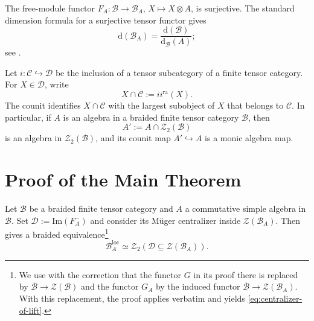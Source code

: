 \documentclass[10pt,a4paper]{amsart}
\numberwithin{equation}{section}
\newcommand{\B}{\mathcal{B}}
\newcommand{\C}{\mathcal{C}}
\newcommand{\D}{\mathcal{D}}
\newcommand{\Z}{\mathcal{Z}}
\newcommand{\loc}{\mathrm{loc}}
\newcommand{\ra}{\mathrm{ra}}
\newcommand{\im}{\mathrm{Im}}
\newcommand{\FP}{\mathrm{d}}
\begin{document}
The free-module functor $F_A:\B\to\B_A$, $X\mapsto X\otimes A$, is
surjective. The standard dimension formula for a surjective tensor functor
gives
\begin{equation}\label{eq:module-category-dimension}
  \FP(\B_A)=\frac{\FP(\B)}{\FP_{\B}(A)};
\end{equation}
see \cite[Lemma~6.2.4]{etingof2016tensor}.



Let $i:\C\hookrightarrow\D$ be the inclusion of a tensor subcategory of a
finite tensor category. For $X\in\D$, write
\[
  X\cap\C:=i i^{\ra}(X).
\]
The counit identifies $X\cap\C$ with the
largest subobject of $X$ that belongs to $\C$. In particular, if $A$ is an
algebra in a braided finite tensor category $\B$, then
\[
  A':=A\cap\Z_2(\B)
\]
is an algebra in $\Z_2(\B)$, and its counit map $A'\hookrightarrow A$ is a
monic algebra map.





\section{Proof of the Main Theorem}
\label{sec:main-theorem}

Let $\B$ be a braided finite tensor category and $A$ a commutative simple algebra in $\B$. 
Set $\D:=\im(F_A^-)$ and consider its M\"uger centralizer 
inside $\Z(\B_A)$. Then
\cite[Theorem~5.13]{shimizu2026commutative} gives a braided equivalence\footnote{We use \cite[Theorem~5.13]{shimizu2026commutative} with the correction that the functor $G$ in its proof there is replaced by $\overline{\mathcal B}\to\mathcal Z(\mathcal B)$ and the functor $G_A$ by the induced functor $\overline{\B}\to\Z(\B_A)$. With this replacement, the proof applies verbatim and yields \eqref{eq:centralizer-of-lift}.}
\begin{equation}\label{eq:centralizer-of-lift}
  \B_A^{\loc}
  \simeq
  \Z_2(\D\subseteq\Z(\B_A)).
\end{equation}
\end{document}
